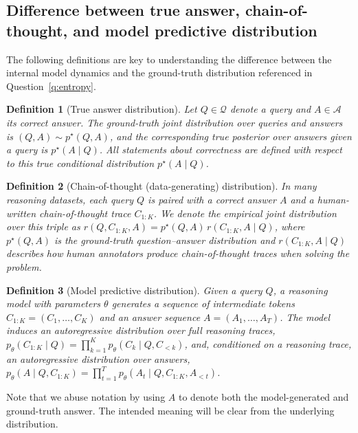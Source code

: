 \documentclass{article}
\newtheorem{definition}{Definition}
\begin{document}
\subsection{Difference between true answer, chain-of-thought, and model predictive distribution}
\label{subsec:preliminaries-distributions}

The following definitions are key to understanding the difference between the internal model dynamics and the ground-truth distribution referenced in Question~\ref{q:entropy}.

\begin{definition}[True answer distribution] Let $Q \in \mathcal{Q}$ denote a query and $A\in \mathcal{A}$ its correct answer. The ground-truth joint distribution over queries and answers is $(Q,A)\sim p^\star(Q,A)$, and the corresponding true posterior over answers given a query is $p^\star(A \mid Q)$. All statements about correctness are defined with respect to this true conditional distribution $p^\star(A \mid Q)$.
\label{def:trueanswer}
\end{definition}

\begin{definition}[Chain-of-thought (data-generating) distribution] In many reasoning datasets, each query $Q$ is paired with a correct answer $A$ and a human-written chain-of-thought trace $C_{1:K}$. We denote the empirical joint distribution over this triple as $r(Q,C_{1:K},A) = p^\star(Q,A)\, r(C_{1:K}, A\mid Q)$,
where $p^\star(Q,A)$ is the ground-truth question--answer distribution and  $r(C_{1:K}, A\mid Q)$ describes how human annotators produce chain-of-thought traces when solving the problem.
\label{def:datadistribution}
\end{definition}

\begin{definition}[Model predictive distribution] Given a query $Q$, a reasoning model with parameters $\theta$ generates a sequence of intermediate tokens $C_{1:K} = (C_1, \dots, C_K)$ and an answer sequence $A= (A_1,\dots,A_T)$. The model induces an autoregressive distribution over full reasoning traces, $p_\theta(C_{1:K} \mid Q) = \prod_{k=1}^K p_\theta(C_k \mid Q, C_{<k})$, and, conditioned on a reasoning trace, an autoregressive distribution over answers, $p_\theta(A \mid Q, C_{1:K})=\prod^T_{t=1} p_\theta(A_t \mid Q, C_{1:K}, A_{<t})$.
\label{def:modelpredictive}
\end{definition}

Note that we abuse notation by using $A$ to denote both the model-generated and ground-truth answer. The intended meaning will be clear from the underlying distribution.
\end{document}
